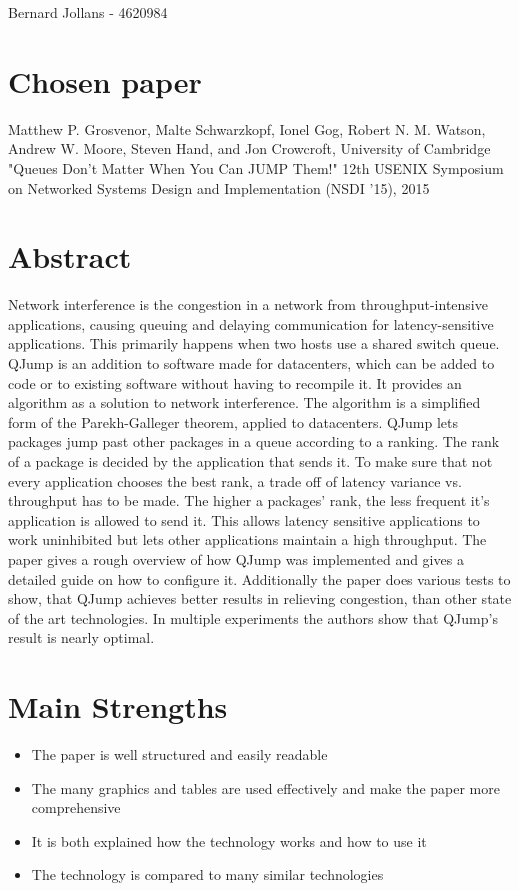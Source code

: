 \documentclass[a4paper]{article}
\begin{document}
\hfill Bernard Jollans - 4620984
\hfill 

\setcounter{secnumdepth}{0}
\section{Chosen paper}
Matthew P. Grosvenor, Malte Schwarzkopf, Ionel Gog, Robert N. M. Watson,  
Andrew W. Moore, Steven Hand, and Jon Crowcroft, University of Cambridge
"Queues Don’t Matter When You Can JUMP Them!" 12th USENIX Symposium on Networked Systems  
Design and Implementation (NSDI ’15), 2015

\setcounter{secnumdepth}{0}
\section{Abstract}
Network interference is the congestion in a network from throughput-intensive applications, causing queuing and delaying communication for latency-sensitive applications. This primarily happens when two hosts use a shared switch queue. QJump is an addition to software made for datacenters, which can be added to code or to existing software without having to recompile it. It provides an algorithm as a solution to network interference. The algorithm is a simplified form of the Parekh-Galleger theorem, applied to datacenters. QJump lets packages jump past other packages in a queue according to a ranking. The rank of a package is decided by the application that sends it. To make sure that not every application chooses the best rank, a trade off of latency variance vs. throughput has to be made. The higher a packages' rank, the less frequent it's application is allowed to send it. This allows latency sensitive applications to work uninhibited but lets other applications maintain a high throughput. The paper gives a rough overview of how QJump was implemented and gives a detailed guide on how to configure it. Additionally the paper does various tests to show, that QJump achieves better results in relieving congestion, than other state of the art technologies. In multiple experiments the authors show that QJump's result is nearly optimal. 

\setcounter{secnumdepth}{0}
\section{Main Strengths}
\begin{itemize}
	\setlength{\itemsep}{-4pt}
	\item The paper is well structured and easily readable
	\item The many graphics and tables are used effectively and make the paper more comprehensive
	\item It is both explained how the technology works and how to use it
	\item The technology is compared to many similar technologies
\end{itemize}
\end{document}
